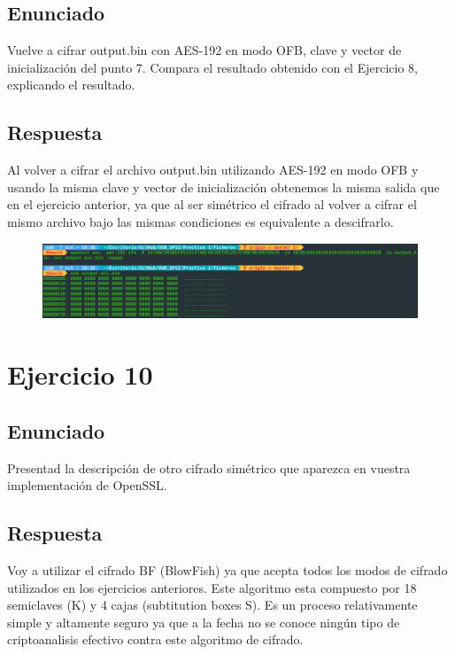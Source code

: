 \documentclass[10pt,a4paper,spanish]{report}
\begin{document}
\section{Enunciado}
\noindent
Vuelve a cifrar output.bin con AES-192 en modo OFB, clave y vector de inicialización del punto 7. Compara el resultado obtenido con el Ejercicio 8, explicando el resultado.

\section{Respuesta}
\noindent
Al volver a cifrar el archivo output.bin utilizando AES-192 en modo OFB y usando la misma clave y vector de inicialización obtenemos la misma salida que en el ejercicio anterior, ya que al ser simétrico el cifrado al volver a cifrar el mismo archivo bajo las mismas condiciones es equivalente a descifrarlo.

\begin{figure}[!hbp]
 \centering  \includegraphics[width=1\textwidth]{./Imagenes/16.png}
\end{figure}


\chapter{Ejercicio 10}

\section{Enunciado}
\noindent
Presentad la descripción de otro cifrado simétrico que aparezca en vuestra implementación de OpenSSL.

\section{Respuesta}
\noindent
Voy a utilizar el cifrado BF (BlowFish) ya que acepta todos los modos de cifrado utilizados en los ejercicios anteriores. Este algoritmo esta compuesto por 18 semiclaves (K) y 4 cajas (subtitution boxes S). Es un proceso relativamente simple y altamente seguro ya que a la fecha no se conoce ningún tipo de criptoanalisis efectivo contra este algoritmo de cifrado.
\end{document}
